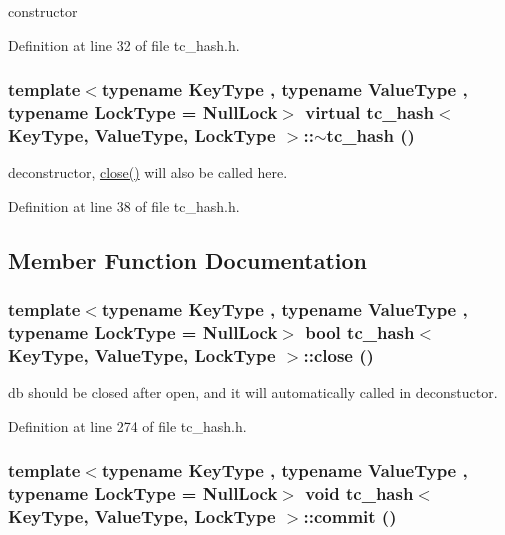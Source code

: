 constructor 

Definition at line 32 of file tc\_\-hash.h.\hypertarget{classtc__hash_1f9a677246db4a5a14be9fb7a5b3547b}{
\subsubsection[{$\sim$tc\_\-hash}]{\setlength{\rightskip}{0pt plus 5cm}template$<$typename KeyType , typename ValueType , typename LockType  = NullLock$>$ virtual {\bf tc\_\-hash}$<$ KeyType, ValueType, LockType $>$::$\sim${\bf tc\_\-hash} ()}}
\label{classtc__hash_1f9a677246db4a5a14be9fb7a5b3547b}


deconstructor, \hyperlink{classtc__hash_8153ff6485a0382fac5b5a20c0cc9033}{close()} will also be called here. 

Definition at line 38 of file tc\_\-hash.h.

\subsection{Member Function Documentation}
\hypertarget{classtc__hash_8153ff6485a0382fac5b5a20c0cc9033}{
\subsubsection[{close}]{\setlength{\rightskip}{0pt plus 5cm}template$<$typename KeyType , typename ValueType , typename LockType  = NullLock$>$ bool {\bf tc\_\-hash}$<$ KeyType, ValueType, LockType $>$::close ()}}
\label{classtc__hash_8153ff6485a0382fac5b5a20c0cc9033}


db should be closed after open, and it will automatically called in deconstuctor. 

Definition at line 274 of file tc\_\-hash.h.\hypertarget{classtc__hash_83474cdc095650dfea677f3b65aaa032}{
\subsubsection[{commit}]{\setlength{\rightskip}{0pt plus 5cm}template$<$typename KeyType , typename ValueType , typename LockType  = NullLock$>$ void {\bf tc\_\-hash}$<$ KeyType, ValueType, LockType $>$::commit ()}}
\label{classtc__hash_83474cdc095650dfea677f3b65aaa032}


